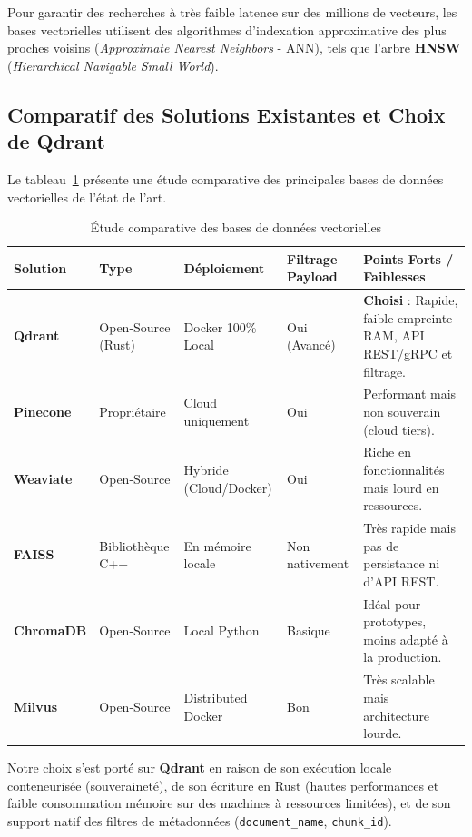 Pour garantir des recherches à très faible latence sur des millions de vecteurs, les bases vectorielles utilisent des algorithmes d'indexation approximative des plus proches voisins (\textit{Approximate Nearest Neighbors} - ANN), tels que l'arbre \textbf{HNSW} (\textit{Hierarchical Navigable Small World}).

\subsection{Comparatif des Solutions Existantes et Choix de Qdrant}
Le tableau~\ref{tab:vector_dbs} présente une étude comparative des principales bases de données vectorielles de l'état de l'art.

\begin{table}[htbp]
\centering
\small
\caption{Étude comparative des bases de données vectorielles}
\label{tab:vector_dbs}
\begin{tabular}{|p{2.0cm}|p{2.6cm}|p{2.6cm}|p{1.8cm}|p{4.5cm}|}
\hline
\textbf{Solution} & \textbf{Type} & \textbf{Déploiement} & \textbf{Filtrage Payload} & \textbf{Points Forts / Faiblesses} \\ \hline
\textbf{Qdrant} & Open-Source (Rust) & Docker 100\% Local & Oui (Avancé) & \textbf{Choisi} : Rapide, faible empreinte RAM, API REST/gRPC et filtrage. \\ \hline
\textbf{Pinecone} & Propriétaire & Cloud uniquement & Oui & Performant mais non souverain (cloud tiers). \\ \hline
\textbf{Weaviate} & Open-Source & Hybride (Cloud/Docker) & Oui & Riche en fonctionnalités mais lourd en ressources. \\ \hline
\textbf{FAISS} & Bibliothèque C++ & En mémoire locale & Non nativement & Très rapide mais pas de persistance ni d'API REST. \\ \hline
\textbf{ChromaDB} & Open-Source & Local Python & Basique & Idéal pour prototypes, moins adapté à la production. \\ \hline
\textbf{Milvus} & Open-Source & Distributed Docker & Bon & Très scalable mais architecture lourde. \\ \hline
\end{tabular}
\end{table}

Notre choix s'est porté sur \textbf{Qdrant} en raison de son exécution locale conteneurisée (souveraineté), de son écriture en Rust (hautes performances et faible consommation mémoire sur des machines à ressources limitées), et de son support natif des filtres de métadonnées (\texttt{document\_name}, \texttt{chunk\_id}).

